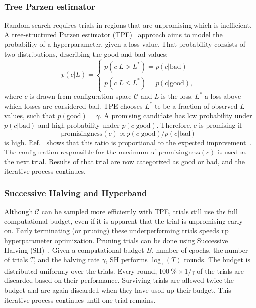 \subsubsection{Tree Parzen estimator}
Random search requires trials in regions that are unpromising which is inefficient.
A tree-structured Parzen estimator (TPE)~ approach aims to model the probability of a hyperparameter, given a loss value.
That probability consists of two distributions, describing the good and bad values:
\begin{equation}
    p(c|L) =
    \begin{cases}
        p(c|L > L^*) = p(c|\mathrm{bad}) \\
        p(c|L \leq L^*) = p(c|\mathrm{good}),
    \end{cases}
\end{equation}
where $c$ is drawn from configuration space $\mathcal{C}$ and $L$ is the loss.
$L^*$ a loss above which losses are considered bad.
TPE chooses $L^*$ to be a fraction of observed $L$ values, such that $p(\mathrm{good}) = \gamma$.
A promising candidate has low probability under $p(c|\mathrm{bad})$ and high probability under $p(c|\mathrm{good})$.
Therefore, $c$ is promising if
\begin{equation}
    \mathrm{promisingness}(c) \propto p(c|\mathrm{good}) / p(c|\mathrm{bad})
\end{equation}
is high.
Ref.~ shows that this ratio is proportional to the expected improvement~.
The configuration responsible for the maximum of $\mathrm{promisingness}(c)$ is used as the next trial.
Results of that trial are now categorized as good or bad, and the iterative process continues.

\subsubsection{Successive Halving and Hyperband}
Although $\mathcal{C}$ can be sampled more efficiently with TPE, trials still use the full computational budget, even if it is apparent that the trial is unpromising early on.
Early terminating (or pruning) these underperforming trials speeds up hyperparameter optimization.
Pruning trials can be done using Successive Halving (SH)~.
Given a computational budget $B$, \eg number of epochs, the number of trials $T$, and the halving rate $\gamma$, SH performs $\log_\gamma(T)$ rounds.
The budget is distributed uniformly over the trials.
Every round, $\qty{100}{\percent} \times 1/\gamma$ of the trials are discarded based on their performance.
Surviving trials are allowed twice the budget and are again discarded when they have used up their budget.
This iterative process continues until one trial remains.

